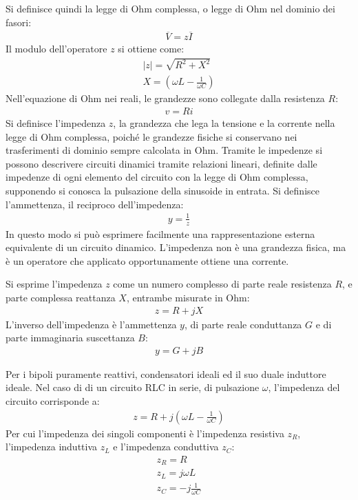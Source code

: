 \documentclass{article}
\numberwithin{equation}{subsection}
\begin{document}
Si definisce quindi la legge di Ohm complessa, o legge di Ohm nel dominio dei fasori:
\begin{gather}
    \overline{V}=z\overline{I}
\end{gather}
Il modulo dell'operatore $z$ si ottiene come:
\begin{gather*}
    |z|=\displaystyle\sqrt{R^2+X^2}\\
    X=\left(\omega L-\displaystyle\frac{1}{\omega C}\right)
\end{gather*}
Nell'equazione di Ohm nei reali, le grandezze sono collegate dalla resistenza $R$:
\begin{gather*}
    v=Ri
\end{gather*}
Si definisce l'impedenza $z$, la grandezza che lega la tensione e la corrente nella legge di Ohm complessa, poiché le grandezze fisiche si conservano nei trasferimenti di 
dominio sempre calcolata in Ohm. 
Tramite le impedenze si possono descrivere circuiti dinamici tramite relazioni lineari, definite dalle impedenze di ogni elemento del circuito con la legge di Ohm complessa, 
supponendo si conosca la pulsazione della sinusoide in entrata. 
Si definisce l'ammettenza, il reciproco dell'impedenza:
\begin{gather}
    y=\displaystyle\frac{1}{z}
\end{gather}
In questo modo si può esprimere facilmente una rappresentazione esterna equivalente di un circuito dinamico. 
L'impedenza non è una grandezza fisica, ma è un operatore che applicato opportunamente ottiene una corrente. 


Si esprime l'impedenza $z$ come un numero complesso di parte reale resistenza $R$, e parte complessa reattanza $X$, entrambe misurate in Ohm:
\begin{gather}
    z=R+jX
\end{gather}
L'inverso dell'impedenza è l'ammettenza $y$, di parte reale conduttanza $G$ e di parte immaginaria suscettanza $B$:
\begin{gather}
    y=G+jB
\end{gather}

Per i bipoli puramente reattivi, condensatori ideali ed il suo duale induttore ideale. 
Nel caso di di un circuito RLC in serie, di pulsazione $\omega$, l'impedenza del circuito corrisponde a:
\begin{gather*}
    z=R+j\left(\displaystyle \omega L-\frac{1}{\omega C}\right)
\end{gather*}
Per cui l'impedenza dei singoli componenti è l'impedenza resistiva $z_R$, l'impedenza induttiva $z_L$ e l'impedenza conduttiva $z_C$:
\begin{gather}
    z_R=R\\
    z_L=j\omega L\\
    z_C=\displaystyle -j\frac{1}{\omega C}
\end{gather}
\end{document}
